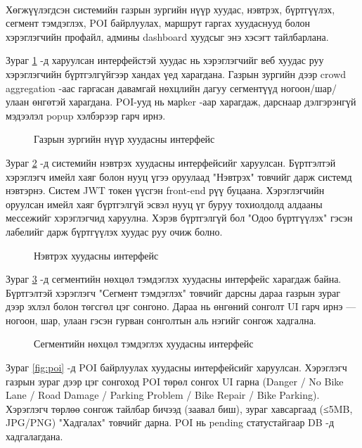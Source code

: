 \paragraph{} Хөгжүүлэгдсэн системийн газрын зургийн нүүр хуудас, нэвтрэх, бүртгүүлэх, сегмент тэмдэглэх, POI байрлуулах, маршрут гаргах хуудаснууд болон хэрэглэгчийн профайл, админы dashboard хуудсыг энэ хэсэгт тайлбарлана.
\par \noindent Зураг \ref{fig:home} -д харуулсан интерфейстэй хуудас нь хэрэглэгчийг веб хуудас руу хэрэглэгчийн бүртгэлгүйгээр хандах үед харагдана. Газрын зургийн дээр crowd aggregation -аас гаргасан давамгай нөхцлийн дагуу сегментүүд ногоон/шар/улаан өнгөтэй харагдана. POI-ууд нь марker -аар харагдаж, дарснаар дэлгэрэнгүй мэдээлэл popup хэлбэрээр гарч ирнэ.
\begin{figure}[H]
    \centering
    \caption{Газрын зургийн нүүр хуудасны интерфейс}
    \label{fig:home}
\end{figure}
\par \noindent Зураг \ref{fig:login} -д системийн нэвтрэх хуудасны интерфейсийг харуулсан. Бүртгэлтэй хэрэглэгч имейл хаяг болон нууц үгээ оруулаад "Нэвтрэх" товчийг дарж системд нэвтэрнэ. Систем JWT токен үүсгэн front-end рүү буцаана. Хэрэглэгчийн оруулсан имейл хаяг бүртгэлгүй эсвэл нууц үг буруу тохиолдолд алдааны мессежийг хэрэглэгчид харуулна. Хэрэв бүртгэлгүй бол "Одоо бүртгүүлэх" гэсэн лабелийг дарж бүртгүүлэх хуудас руу очиж болно.
\begin{figure}[H]
    \centering
    \caption{Нэвтрэх хуудасны интерфейс}
    \label{fig:login}
\end{figure}
\par \noindent Зураг \ref{fig:segment} -д сегментийн нөхцөл тэмдэглэх хуудасны интерфейс харагдаж байна. Бүртгэлтэй хэрэглэгч "Сегмент тэмдэглэх" товчийг дарсны дараа газрын зураг дээр эхлэл болон төгсгөл цэг сонгоно. Дараа нь өнгөний сонголт UI гарч ирнэ — ногоон, шар, улаан гэсэн гурван сонголтын аль нэгийг сонгож хадгална.
\begin{figure}[H]
    \centering
    \caption{Сегментийн нөхцөл тэмдэглэх хуудасны интерфейс}
    \label{fig:segment}
\end{figure}
\par \noindent Зураг \ref{fig:poi} -д POI байрлуулах хуудасны интерфейсийг харуулсан. Хэрэглэгч газрын зураг дээр цэг сонгоход POI төрөл сонгох UI гарна (Danger / No Bike Lane / Road Damage / Parking Problem / Bike Repair / Bike Parking). Хэрэглэгч төрлөө сонгож тайлбар бичээд (заавал биш), зураг хавсаргаад (≤5MB, JPG/PNG) "Хадгалах" товчийг дарна. POI нь pending статустайгаар DB -д хадгалагдана.
